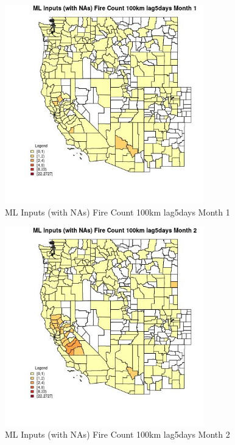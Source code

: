 \begin{figure} 
\centering  
\includegraphics[width=0.77\textwidth]{Code_Outputs/Report_ML_input_PM25_Step4_part_f_de_duplicated_aveswNAs_CountyFire_Count_100km_lag5daysmedianMonth1.jpg} 
\caption{\label{fig:Report_ML_input_PM25_Step4_part_f_de_duplicated_aveswNAsCountyFire_Count_100km_lag5daysmedianMonth1}ML Inputs (with NAs) Fire Count 100km lag5days Month 1} 
\end{figure} 
 

\begin{figure} 
\centering  
\includegraphics[width=0.77\textwidth]{Code_Outputs/Report_ML_input_PM25_Step4_part_f_de_duplicated_aveswNAs_CountyFire_Count_100km_lag5daysmedianMonth2.jpg} 
\caption{\label{fig:Report_ML_input_PM25_Step4_part_f_de_duplicated_aveswNAsCountyFire_Count_100km_lag5daysmedianMonth2}ML Inputs (with NAs) Fire Count 100km lag5days Month 2} 
\end{figure} 
 

